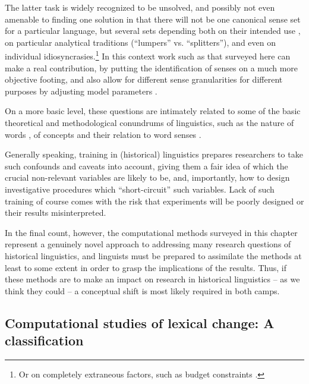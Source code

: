 \documentclass[output=paper]{langsci/langscibook}
\begin{document}
The latter task is widely recognized to be unsolved, and possibly not
even amenable to finding one solution in that there will not be one
canonical sense set for a particular language, but several sets
depending both on their intended use \citep{kilgarriff1997}, on
particular analytical traditions (``lumpers'' vs. ``splitters''), and
even on individual idiosyncrasies.\footnote{Or on completely
  extraneous factors, such as budget constraints \citep{lange-2002}.}
In this context work such as that surveyed here can make a real
contribution, by putting the identification of senses on a much more
objective footing, and also allow for different sense granularities
for different purposes by adjusting model parameters \citep{erk-2010}.

On a more basic level, these questions are intimately related to some
of the basic theoretical and methodological conundrums of linguistics,
such as the nature of words
\citep{aikhenvald-dixon-2002,haspelmath-2011}, of concepts
\citep{murphy-2002,wilks-2009,riemer-2010} and their relation to word
senses \citep{cruse-1986,kilgarriff1997,kilgarriff-2004,hanks-2013}.

Generally speaking, training in (historical) linguistics prepares
researchers to take such confounds and caveats into account, giving
them a fair idea of which the crucial non-relevant variables are
likely to be, and, importantly, how to design investigative procedures
which ``short-circuit'' such variables. Lack of such training of
course comes with the risk that experiments will be poorly designed or
their results misinterpreted.

In the final count, however, the computational methods surveyed in
this chapter represent a genuinely novel approach to addressing many
research questions of historical linguistics, and linguists must be
prepared to assimilate the methods at least to some extent in order to
grasp the implications of the results. Thus, if these methods are to
make an impact on research in historical linguistics -- as we think
they could -- a conceptual shift is most likely required in both
camps.

\subsection{Computational studies of lexical change: A classification}
\end{document}
